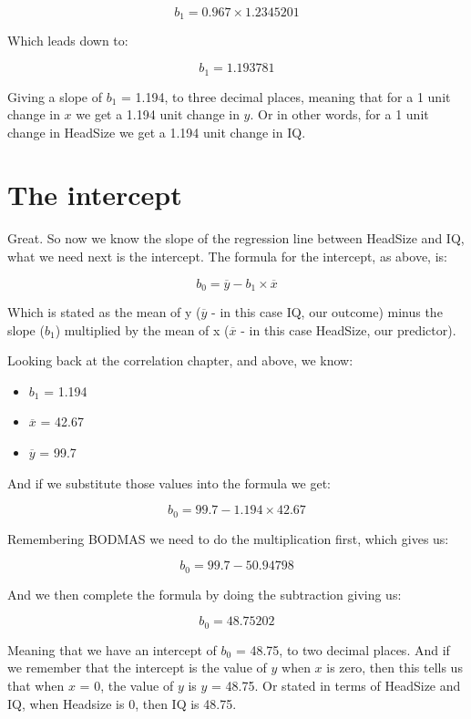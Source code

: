 \documentclass[
  oneside]{book}
\providecommand{\tightlist}{%
  \setlength{\itemsep}{0pt}\setlength{\parskip}{0pt}}
\begin{document}
\[b_{1} = 0.967 \times 1.2345201\]

Which leads down to:

\[b_{1} = 1.193781\]

Giving a slope of \(b_{1}\) = 1.194, to three decimal places, meaning that for a 1 unit change in \(x\) we get a 1.194 unit change in \(y\). Or in other words, for a 1 unit change in HeadSize we get a 1.194 unit change in IQ.

\hypertarget{the-intercept}{%
\section{The intercept}\label{the-intercept}}

Great. So now we know the slope of the regression line between HeadSize and IQ, what we need next is the intercept. The formula for the intercept, as above, is:

\[b_{0} = \overline{y} - b_{1} \times \overline{x}\]

Which is stated as the mean of y (\(\overline{y}\) - in this case IQ, our outcome) minus the slope (\(b_{1}\)) multiplied by the mean of x (\(\overline{x}\) - in this case HeadSize, our predictor).

Looking back at the correlation chapter, and above, we know:

\begin{itemize}
\tightlist
\item
  \(b_{1}\) = 1.194
\item
  \(\overline{x}\) = 42.67
\item
  \(\overline{y}\) = 99.7
\end{itemize}

And if we substitute those values into the formula we get:

\[b_{0} = 99.7 - 1.194 \times 42.67\]

Remembering BODMAS we need to do the multiplication first, which gives us:

\[b_{0} = 99.7 - 50.94798\]

And we then complete the formula by doing the subtraction giving us:

\[b_{0} = 48.75202\]

Meaning that we have an intercept of \(b_{0}\) = 48.75, to two decimal places. And if we remember that the intercept is the value of \(y\) when \(x\) is zero, then this tells us that when \(x\) = 0, the value of \(y\) is \(y\) = 48.75. Or stated in terms of HeadSize and IQ, when Headsize is 0, then IQ is 48.75.
\end{document}
